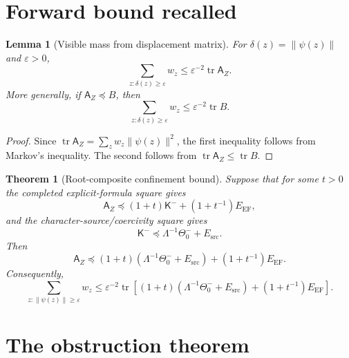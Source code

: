 \documentclass[11pt]{article}
\newtheorem{theorem}{Theorem}
\newtheorem{lemma}{Lemma}
\newcommand{\K}{\mathsf K}
\newcommand{\A}{\mathsf A}
\newcommand{\EF}{\mathrm{EF}}
\newcommand{\src}{\mathrm{src}}
\newcommand{\tr}{\operatorname{tr}}
\newcommand{\pre}{\preceq}
\begin{document}
\section{Forward bound recalled}

\begin{lemma}[Visible mass from displacement matrix]
For $\delta(z)=\|\psi(z)\|$ and $\varepsilon>0$,
\[
\sum_{z:\delta(z)\ge \varepsilon}w_z
\le
\varepsilon^{-2}\tr\A_Z.
\]
More generally, if $\A_Z\pre B$, then
\[
\sum_{z:\delta(z)\ge \varepsilon}w_z
\le
\varepsilon^{-2}\tr B.
\]
\end{lemma}

\begin{proof}
Since $\tr\A_Z=\sum_z w_z\|\psi(z)\|^2$, the first inequality follows from Markov's inequality.  The second follows from $\tr\A_Z\le\tr B$.
\end{proof}

\begin{theorem}[Root-composite confinement bound]
Suppose that for some $t>0$ the completed explicit-formula square gives
\[
\A_Z\pre (1+t)\K^-+(1+t^{-1})E_{\EF},
\]
and the character-source/coercivity square gives
\[
\K^-\pre \Lambda^{-1}\Theta_0^-+E_{\src}.
\]
Then
\[
\A_Z\pre (1+t)(\Lambda^{-1}\Theta_0^-+E_{\src})+(1+t^{-1})E_{\EF}.
\]
Consequently,
\[
\boxed{
\sum_{z:\|\psi(z)\|\ge\varepsilon}w_z
\le
\varepsilon^{-2}\tr\left[(1+t)(\Lambda^{-1}\Theta_0^-+E_{\src})+(1+t^{-1})E_{\EF}\right].
}
\]
\end{theorem}

\section{The obstruction theorem}
\end{document}

